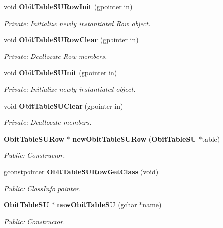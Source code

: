 \begin{CompactItemize}
\item 
void {\bf Obit\-Table\-SURow\-Init} (gpointer in)
\begin{CompactList}\small\item\em Private: Initialize newly instantiated Row object. \item\end{CompactList}\item 
void {\bf Obit\-Table\-SURow\-Clear} (gpointer in)
\begin{CompactList}\small\item\em Private: Deallocate Row members. \item\end{CompactList}\item 
void {\bf Obit\-Table\-SUInit} (gpointer in)
\begin{CompactList}\small\item\em Private: Initialize newly instantiated object. \item\end{CompactList}\item 
void {\bf Obit\-Table\-SUClear} (gpointer in)
\begin{CompactList}\small\item\em Private: Deallocate members. \item\end{CompactList}\item 
{\bf Obit\-Table\-SURow} $\ast$ {\bf new\-Obit\-Table\-SURow} ({\bf Obit\-Table\-SU} $\ast$table)
\begin{CompactList}\small\item\em Public: Constructor. \item\end{CompactList}\item 
gconstpointer {\bf Obit\-Table\-SURow\-Get\-Class} (void)
\begin{CompactList}\small\item\em Public: Class\-Info pointer. \item\end{CompactList}\item 
{\bf Obit\-Table\-SU} $\ast$ {\bf new\-Obit\-Table\-SU} (gchar $\ast$name)
\begin{CompactList}\small\item\em Public: Constructor. \item\end{CompactList}\item 

\end{CompactItemize}
